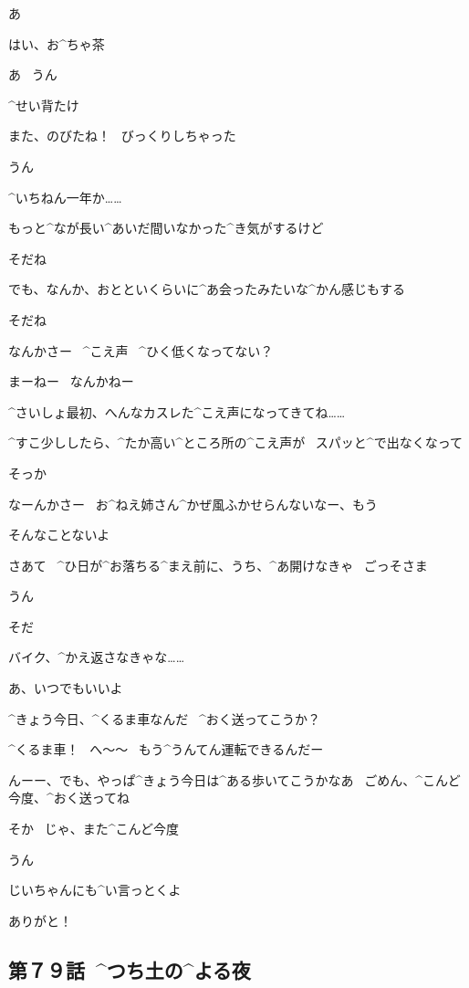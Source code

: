 \page[21]
\Takahiro あ

\Takahiro はい、お^{ちゃ}{茶}

\Alpha あ
\ うん

\Alpha ^{せい}{背}たけ

\Alpha また、のびたね！
\ びっくりしちゃった

\Takahiro うん

\page
\Takahiro ^{いちねん}{一年}か……

\Takahiro もっと^{なが}{長}い^{あいだ}{間}いなかった^{き}{気}がするけど

\Alpha そだね

\Takahiro でも、なんか、おとといくらいに^{あ}{会}ったみたいな^{かん}{感}じもする

\Alpha そだね

\Alpha なんかさー
\ ^{こえ}{声}
\ ^{ひく}{低}くなってない？

\Takahiro まーねー
\ なんかねー

\page
\Takahiro ^{さいしょ}{最初}、へんなカスレた^{こえ}{声}になってきてね……

\Takahiro ^{すこ}{少}ししたら、^{たか}{高}い^{ところ}{所}の^{こえ}{声}が
\ スパッと^{で}{出}なくなって

\Alpha そっか

\Alpha なーんかさー
\ お^{ねえ}{姉}さん^{かぜ}{風}ふかせらんないなー、もう

\Takahiro そんなことないよ

\page[25]
\Alpha さあて
\ ^{ひ}{日}が^{お}{落}ちる^{まえ}{前}に、うち、^{あ}{開}けなきゃ
\ ごっそさま

\Takahiro うん

\Takahiro そだ

\Takahiro バイク、^{かえ}{返}さなきゃな……

\Alpha あ、いつでもいいよ

\Takahiro ^{きょう}{今日}、^{くるま}{車}なんだ
\ ^{おく}{送}ってこうか？

\Alpha ^{くるま}{車}！
\ へ〜〜
\ もう^{うんてん}{運転}できるんだー

\page
\Alpha んーー、でも、やっぱ^{きょう}{今日}は^{ある}{歩}いてこうかなあ
\ ごめん、^{こんど}{今度}、^{おく}{送}ってね

\Takahiro そか
\ じゃ、また^{こんど}{今度}

\Alpha うん

\page
\Takahiro じいちゃんにも^{い}{言}っとくよ

\Alpha ありがと！


\subsection{第７９話\ ^{つち}{土}の^{よる}{夜}}

